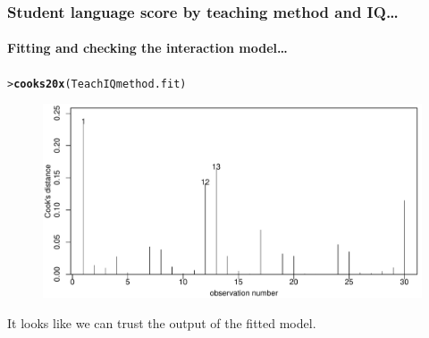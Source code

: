 \documentclass{beamer}\usepackage[]{graphicx}\usepackage[]{xcolor}
\makeatletter
\newcommand{\hlstd}[1]{\textcolor[rgb]{0.345,0.345,0.345}{#1}}%
\newcommand{\hlkwd}[1]{\textcolor[rgb]{0.737,0.353,0.396}{\textbf{#1}}}%
\newenvironment{kframe}{%
 \def\at@end@of@kframe{}%
 \ifinner\ifhmode%
  \def\at@end@of@kframe{\end{minipage}}%
  \begin{minipage}{\columnwidth}%
 \fi\fi%
 \def\FrameCommand##1{\hskip\@totalleftmargin \hskip-\fboxsep
 \colorbox{shadecolor}{##1}\hskip-\fboxsep
     \hskip-\linewidth \hskip-\@totalleftmargin \hskip\columnwidth}%
 \MakeFramed {\advance\hsize-\width
   \@totalleftmargin\z@ \linewidth\hsize
   \@setminipage}}%
 {\par\unskip\endMakeFramed%
 \at@end@of@kframe}
\newenvironment{knitrout}{}{} %
\makeatother
\begin{document}
\begin{frame}[fragile]
\frametitle{Student language score by  teaching method and IQ\ldots}
\framesubtitle{Fitting and checking the interaction model\ldots}
\begin{knitrout}\scriptsize
{}\color{fgcolor}\begin{kframe}
\begin{alltt}
\hlstd{> }\hlkwd{cooks20x}\hlstd{(TeachIQmethod.fit)}
\end{alltt}
\end{kframe}
\end{knitrout}



\begin{figure}
  \centering
  \includegraphics[scale=0.5]{figure/RC-H09-013}
\end{figure}

It looks like we can trust the output of the fitted model.
\end{frame}




\end{document}
